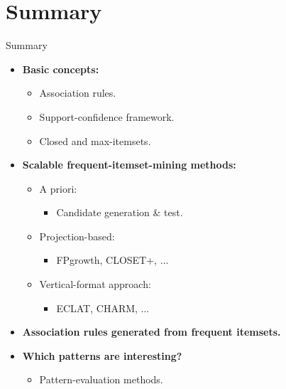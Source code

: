 \section{Summary}

\begin{frame}{Summary}
	\begin{itemize}
		\item \textbf{Basic concepts:}
		\begin{itemize}
			\item Association rules.
			\item Support-confidence framework.
			\item Closed and max-itemsets.
		\end{itemize}
		\item \textbf{Scalable frequent-itemset-mining methods:}
		\begin{itemize}
			\item A priori:
			\begin{itemize}
				\item Candidate generation \& test.
			\end{itemize}
			\item Projection-based:
			\begin{itemize}
				\item FPgrowth, CLOSET+, $\ldots$
			\end{itemize}
			\item Vertical-format approach:
			\begin{itemize}
				\item ECLAT, CHARM, $\ldots$
			\end{itemize}
		\end{itemize}
		\item \textbf{Association rules generated from frequent 
			itemsets.}
		\item \textbf{Which patterns are interesting?}
		\begin{itemize}
			\item Pattern-evaluation methods.
		\end{itemize}
	\end{itemize}
\end{frame}